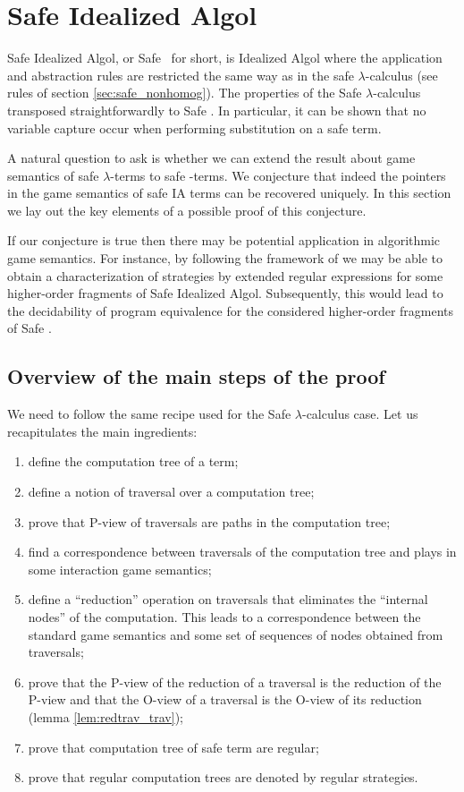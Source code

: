 \section{Safe Idealized Algol}

Safe Idealized Algol, or Safe \ialgol\ for short, is Idealized Algol where the application and abstraction rules are restricted
the same way as in the safe $\lambda$-calculus (see rules of section \ref{sec:safe_nonhomog}).
The properties of the Safe $\lambda$-calculus transposed straightforwardly to Safe \ialgol. In particular, it can be shown that
no variable capture occur when performing substitution on a safe term.

A natural question to ask is whether we can extend the result about game semantics of safe $\lambda$-terms to safe \ialgol-terms.
We conjecture that indeed the pointers in the game semantics of safe IA terms can be recovered uniquely.
In this section we lay out the key elements of a possible proof of this conjecture.

If our conjecture is true then there may be potential application in algorithmic game semantics.
For instance, by following the framework of \cite{ghicamccusker00} we may be able to obtain a characterization of strategies
by extended regular expressions for some higher-order fragments of Safe Idealized Algol.
Subsequently, this would lead to the decidability of program equivalence
for the considered higher-order fragments of Safe \ialgol.

\subsection{Overview of the main steps of the proof}
We need to follow the same recipe used for the Safe $\lambda$-calculus case.
Let us recapitulates the main ingredients:
\begin{enumerate}
\item define the computation tree of a term;
\item define a notion of traversal over a computation tree;
\item prove that P-view of traversals are paths in the computation tree;
\item find a correspondence between traversals of the computation tree and plays in some interaction game semantics;
\item define a ``reduction'' operation on traversals that eliminates the ``internal nodes'' of the computation. This leads to a
correspondence between the standard game semantics and some set of sequences of nodes obtained from traversals;
\item prove that the P-view of the reduction of a traversal is the reduction of the P-view
and that the O-view of a traversal is the O-view of its reduction (lemma \ref{lem:redtrav_trav});
\item prove that computation tree of safe term are regular;
\item prove that regular computation trees are denoted by regular strategies.
\end{enumerate}

